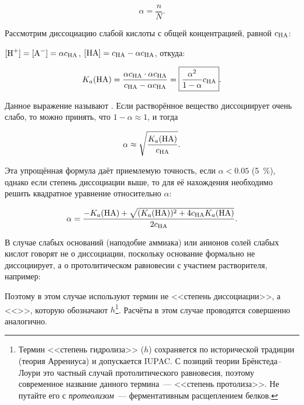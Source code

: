 \begin{equation*}
    \boxed{\alpha = \frac{n}{N}}.
\end{equation*}

Рассмотрим диссоциацию слабой кислоты  с общей концентрацией, равной $c_{\ce{HA}}$:


$[\ce{H^+}] = [\ce{A^-}] = \alpha c_{\ce{HA}}$, $[\ce{HA}] = c_{\ce{HA}} - \alpha c_{\ce{HA}}$, откуда:

\begin{equation*}
    K_a(\ce{HA}) = \frac{\alpha c_{\ce{HA}} \cdot \alpha c_{\ce{HA}}}{c_{\ce{HA}} - \alpha c_{\ce{HA}}}
    = \boxed{\frac{{\alpha}^2}{1 - \alpha}c_{\ce{HA}}}.
\end{equation*}

Данное выражение называют . Если растворённое вещество диссоциирует очень слабо, то можно принять, что $1 - \alpha \approx 1$, и тогда

\begin{equation*}
    \alpha \approx \sqrt{\frac{K_a(\ce{HA})}{c_{\ce{HA}}}}.
\end{equation*}

Эта упрощённая формула даёт приемлемую точность, если $\alpha < \num{0,05}$ (\qty{5}{\percent}), однако если степень диссоциации выше, то для её нахождения необходимо решить квадратное уравнение относительно $\alpha$:

\begin{equation*}
    \alpha = \frac{-K_a(\ce{HA}) + \sqrt{(K_a(\ce{HA}))^2 + 4c_{\ce{HA}}K_a(\ce{HA})}}{2c_{\ce{HA}}}.
\end{equation*}

В случае слабых оснований (наподобие аммиака) или анионов солей слабых кислот говорят не о диссоциации, поскольку основание формально не диссоциирует, а о протолитическом равновесии с участием растворителя, например:


Поэтому в этом случае используют термин не <<степень диссоциации>>, а <<>>, которую обозначают $h$\footnote{Термин <<степень гидролиза>> ($h$) сохраняется по исторической традиции (теория Аррениуса) и допускается IUPAC. С позиций теории Брёнстеда--Лоури это частный случай протолитического равновесия, поэтому современное название данного термина~--- <<степень протолиза>>. Не путайте его с \emph{протеолизом}~--- ферментативным расщеплением белков.}. Расчёты в этом случае проводятся совершенно аналогично.

